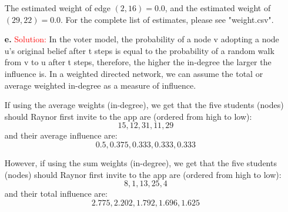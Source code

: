 \documentclass[11pt]{article} %
\begin{document}
\begin{itemize}
The estimated weight of edge $(2, 16)=0.0$, and the estimated weight of $(29,22)=0.0$.  For the complete list of estimates, please see "weight.csv".

\item[\textbf{e. }]  
\textcolor{red}{Solution:}
In the voter model, the probability of a node v adopting a node u's original belief after t steps is equal to the probability of a random walk from v to u after t steps, therefore, the higher the in-degree the larger the influence is. In a weighted directed network, we can assume the total or average weighted in-degree as a measure of influence.

If using the average weights (in-degree), we get that the five students (nodes) should Raynor first invite to the app are (ordered from high to low): 
$$ 15,12,31,11,29$$
and their average influence are: 
$$ 0.5, 0.375, 0.333, 0.333, 0.333 $$ 

However, if using the sum weights (in-degree), we get that the five students (nodes) should Raynor first invite to the app are (ordered from high to low): 
$$8, 1, 13, 25, 4 $$
and their total influence are: 
$$ 2.775, 2.202, 1.792, 1.696, 1.625 $$
 
\end{itemize}    
   
 
 
\end{document}
